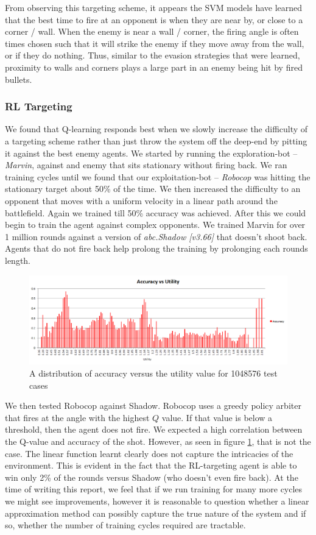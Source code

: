 \documentclass{article}
\theoremstyle{plain}
\theoremstyle{definition}
\theoremstyle{remark}
\begin{document}
From observing this targeting scheme, it appears the SVM models have learned that the best time to fire at an opponent is when they are near by, or close to a corner / wall. When the enemy is near a wall / corner, the firing angle is often times chosen such that it will strike the enemy if they move away from the wall, or if they do nothing. Thus, similar to the evasion strategies that were learned, proximity to walls and corners plays a large part in an enemy being hit by fired bullets. 

\subsubsection*{RL Targeting}
We found that Q-learning responds best when we slowly increase the difficulty of a targeting scheme rather than just throw the system off the deep-end by pitting it against the best enemy agents. We started by running the exploration-bot -- \emph{Marvin}, against and enemy that sits stationary without firing back. We ran training cycles until we found that our exploitation-bot -- \emph{Robocop} was hitting the stationary target about 50\% of the time. We then increased the difficulty to an opponent that moves with a uniform velocity in a linear path around the battlefield. Again we trained till 50\% accuracy was achieved. After this we could begin to train the agent against complex opponents. We trained Marvin for over 1 million rounds against a version of \emph{abc.Shadow [v3.66]} that doesn't shoot back. Agents that do not fire back help prolong the training by prolonging each rounds length.
\begin{figure}[h]
	\centering
		\includegraphics[width=15 cm]{Q_accu.png}
	\caption{A distribution of accuracy versus the utility value for 1048576 test cases}
	\label{q_accu}
\end{figure}
We then tested Robocop against Shadow. Robocop uses a greedy policy arbiter that fires at the angle with the highest $Q$ value. If that value is below a threshold, then the agent does not fire. We expected a high correlation between the Q-value and accuracy of the shot. However, as seen in figure \ref{q_accu}, that is not the case. The linear function learnt clearly does not capture the intricacies of the environment. This is evident in the fact that the RL-targeting agent is able to win only 2\% of the rounds versus Shadow (who doesn't even fire back). At the time of writing this report, we feel that if we run training for many more cycles we might see improvements, however it is reasonable to question whether a linear approximation method can possibly capture the true nature of the system and if so, whether the number of training cycles required are tractable.
\end{document}
